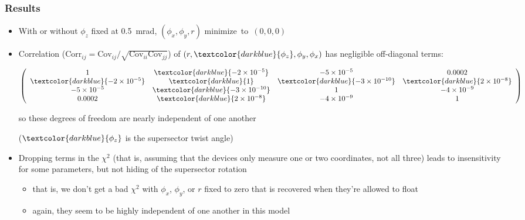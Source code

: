 \documentclass[compress]{beamer}
\begin{document}
\begin{frame}
\frametitle{Results}
\begin{itemize}
\item With or without $\phi_z$ fixed at 0.5~mrad, $(\phi_x, \phi_y, r)$ \mbox{minimize to $(0, 0, 0)$\hspace{-1 cm}}
\item Correlation ($\mbox{Corr}_{ij} = \mbox{Cov}_{ij} /
  \sqrt{\mbox{Cov}_{ii} \mbox{Cov}_{jj}}$) of $(r, \textcolor{darkblue}{\phi_z}, \phi_y, \phi_x)$
  has negligible off-diagonal terms:

$\displaystyle \left(\begin{array}{c c c c}
1 & \textcolor{darkblue}{-2\times 10^{-5}} & -5\times 10^{-5} & 0.0002 \\
\textcolor{darkblue}{-2\times 10^{-5}} & \textcolor{darkblue}{1} & \textcolor{darkblue}{-3\times 10^{-10}} & \textcolor{darkblue}{2\times 10^{-8}} \\
-5\times 10^{-5} & \textcolor{darkblue}{-3\times 10^{-10}} & 1 & -4\times 10^{-9} \\
0.0002 & \textcolor{darkblue}{2\times 10^{-8}} & -4\times 10^{-9} & 1 \end{array}\right) $

so these degrees of freedom are nearly independent of one another

($\textcolor{darkblue}{\phi_z}$ is the supersector twist angle)

\item Dropping terms in the $\chi^2$ (that is, assuming that the
  devices only measure one or two coordinates, not all three) leads to
  insensitivity for some parameters, but not hiding of the supersector
  rotation
\begin{itemize}
\item that is, we don't get a bad $\chi^2$ with $\phi_x$, $\phi_y$, or
  $r$ fixed to zero that is recovered when they're allowed to float
\item again, they seem to be highly independent of one another in this model
\end{itemize}
\end{itemize}
\end{frame}
\end{document}
